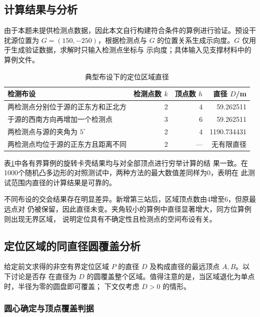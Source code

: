 \documentclass[withoutpreface,bwprint]{cumcmthesis} %
\begin{document}
\subsection{计算结果与分析}

由于本题未提供检测点数据，因此本文自行构建符合条件的算例进行验证。预设干扰源位置为
 $G=(150,-250)$，根据检测点与 $G$ 的位置关系生成示向度。$G$ 仅用于生成验证数据，求解时只输入检测点坐标与
  示向度；具体输入见支撑材料中的算例文件。

\begin{table}[htbp]
    \centering
    \caption{典型布设下的定位区域直径}
    \label{tab:p1-results-concise}
    \begin{tabular}{lrrr}
        \toprule
        检测布设 & 检测点数 $k$ & 顶点数 $h$ & 直径 $D$/m \\
        \midrule
        两检测点分别位于源的正东方和正北方 & 2 & 4 & 59.262511 \\
        于源的西南方向再增加一个检测点 & 3 & 6 & 59.262511 \\
        两检测点与源的夹角为 $5^\circ$ & 2 & 4 & 1190.734431 \\
        两检测点均位于源的正东方且距离不同 & 2 & --- & 无有限直径 \\
        \bottomrule
    \end{tabular}
\end{table}

表\ref{tab:p1-results-concise}中各有界算例的旋转卡壳结果均与对全部顶点进行穷举计算的结
果一致。在1000个随机凸多边形的对照测试中，两种方法的最大数值差同样为0，表明在
此测试范围内直径的计算结果是可靠的。

不同布设的交会结果存在明显差异。新增第三站后，区域顶点数由4增至6，但原最远点对
仍被保留，因此直径未变。夹角较小的算例中直径显著增大，同方位算例则出现无界区域，
说明定位具有不确定性且检测点的空间布设有关。

\subsection{定位区域的同直径圆覆盖分析}

给定前文求得的非空有界定位区域 $P$ 的直径 $D$ 及构成直径的最远顶点 $A,B$。以下讨论是否存
在直径为 $D$ 的圆覆盖整个区域。值得注意的是，当区域退化为单点时，半径为零的圆盘即可覆盖；
下文仅考虑 $D>0$ 的情形。

\subsubsection{圆心确定与顶点覆盖判据}
\end{document}
